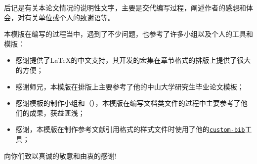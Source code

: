 \begin{acknowledgements}
    后记是有关本论文情况的说明性文字，主要是交代编写过程，阐述作者的感想和体会，对有关单位或个人的致谢语等。

    本模版在编写的过程当中，遇到了不少问题，也参考了许多小组以及个人的工具和模版：
    \begin{itemize}
        \item 感谢\href{https://github.com/CTeX-org/ctex-kit}{}提供了\LaTeX{}的中文支持，其开发的\href{https://ctan.org/tex-archive/language/chinese/ctex}{}宏集在章节格式的排版上提供了很大的方便；
        \item 感谢\href{https://www.zhihu.com/people/sgcd-33}{}师兄，本模版在排版上主要参考了他的中山大学研究生毕业论文模板\href{https://www.overleaf.com/latex/templates/zhong-shan-da-xue-yan-jiu-sheng-bi-ye-lun-wen-mo-ban-sysupalte/kybsnywqbcdc}{}；
        \item 感谢\href{https://github.com/sjtug/SJTUThesis}{}模板的制作小组和\href{https://github.com/nanmu42}{}（\href{https://github.com/nanmu42/CQUThesis}{}），本模版在编写文档类文件的过程中主要参考了他们的成果，获益匪浅；
        \item 感谢\href{https://www.ctan.org/author/daly}{}，本模版在制作参考文献引用格式的样式文件时使用了他的\href{https://www.ctan.org/tex-archive/macros/latex/contrib/custom-bib/}{\texttt{custom-bib}}工具；
    \end{itemize}
    向你们致以真诚的敬意和由衷的感谢!
\end{acknowledgements}

